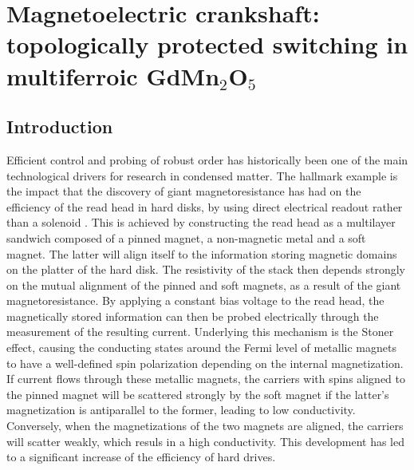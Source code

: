 \newcommand{\Jpar}{J_{||}}
\newcommand{\Jperp}{J_{\perp}}
\chapter{Magnetoelectric crankshaft: topologically protected switching in multiferroic GdMn$_2$O$_5$ \label{ch:GdMn2O5}}
\section{Introduction}
Efficient control and probing of robust order has historically been one of the main technological drivers for research in condensed matter.
The hallmark example is the impact that the discovery of giant magnetoresistance has had on the efficiency of the read head in hard disks, by using direct electrical readout rather than a solenoid \cite{Baibich1988,Binasch1989,Tsymbal2001,Nunez2006TheoryMetals,Chappert2007}.
This is achieved by constructing the read head as a multilayer sandwich composed of a pinned magnet, a non-magnetic metal and a soft magnet.
The latter will align itself to the information storing magnetic domains on the platter of the hard disk.
The resistivity of the stack then depends strongly on the mutual alignment of the pinned and soft magnets, as a result of the giant magnetoresistance.
By applying a constant bias voltage to the read head, the magnetically stored information can then be probed electrically through the measurement of the resulting current.
Underlying this mechanism is the Stoner effect, causing the conducting states around the Fermi level of metallic magnets to have a well-defined spin polarization depending on the internal magnetization.
If current flows through these metallic magnets, the carriers with spins aligned to the pinned magnet will be scattered strongly by the soft magnet if the latter's magnetization is antiparallel to the former, leading to low conductivity.
Conversely, when the magnetizations of the two magnets are aligned, the carriers will scatter weakly, which resuls in a high conductivity.
This development has led to a significant increase of the efficiency of hard drives.

